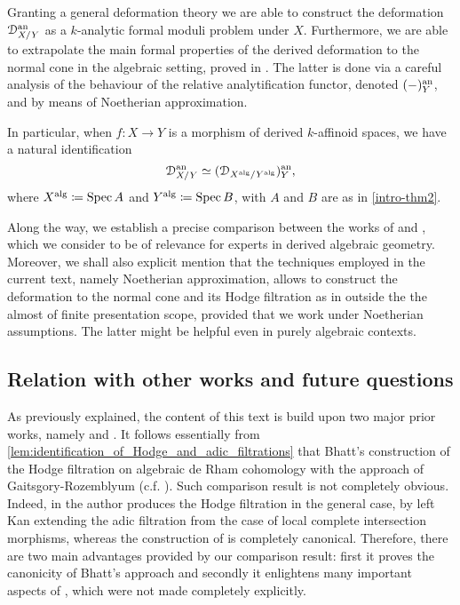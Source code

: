 \documentclass[10pt,a4paper,reqno]{amsart} %
\theoremstyle{plain}
\theoremstyle{definition}
\theoremstyle{remark}
\numberwithin{equation}{section}
\begin{document}
Granting a general deformation theory we are able to construct the deformation $\mathcal D_{X/ Y}^\mathrm{an}$
as a $k$-analytic formal moduli problem
under $X$. Furthermore, we are able to extrapolate the main formal properties of the derived deformation to the normal cone in the algebraic setting, proved in \cite[\S 9]{Gaitsgory_Study_II}.
The latter is done via a careful analysis of the behaviour of the relative analytification functor, denoted $(-)^\mathrm{an}_Y$, and by means of
Noetherian approximation.

In particular, when $f \colon X \to Y$ is a morphism of derived $k$-affinoid spaces, we have a natural identification
    \[
        \mathcal D_{X/ Y}^\mathrm{an} \simeq (\mathcal D_{X^\mathrm{alg}/ Y^\mathrm{alg}} )^\mathrm{an}_Y,  
    \]
where $X^\mathrm{alg} \coloneqq \operatorname{Spec} A$ and $Y^\mathrm{alg} \coloneqq \operatorname{Spec} B$, with $A$ and $B$ are as in \cref{intro-thm2}. 

Along the way, we establish a precise comparison between the works of \cite{Bhatt_Derived_Completions} and \cite[\S 9]{Gaitsgory_Study_II},
which we consider to be of relevance for experts in derived algebraic geometry. Moreover, we shall also explicit mention that the techniques employed in the current
text, namely Noetherian approximation, allows to construct the deformation to the normal cone and its Hodge filtration
as in \cite[\S 9]{Gaitsgory_Study_II} outside the the almost of finite presentation scope, provided that we work under Noetherian assumptions. The latter
might be helpful even in purely algebraic contexts.

\subsection{Relation with other works and future questions} As previously explained, the content of this text is build upon two major prior works,
namely \cite[\S 9]{Gaitsgory_Study_II} and \cite{Bhatt_Derived_Completions}. It follows essentially from \cref{lem:identification_of_Hodge_and_adic_filtrations}
that
Bhatt's construction of the Hodge filtration on algebraic de Rham cohomology with the approach of Gaitsgory-Rozemblyum (c.f. \cite[\S 9]{Gaitsgory_Study_II}).
Such comparison result is not completely obvious. Indeed, in \cite{Bhatt_Derived_Completions} the author produces the Hodge filtration in the general case, by left Kan extending the adic
filtration from the case of local complete intersection morphisms, whereas the construction of \cite[\S 9]{Gaitsgory_Study_II} is completely canonical. Therefore,
there are two main advantages provided by our comparison result: first it proves the canonicity of Bhatt's approach and secondly it enlightens many
important aspects of \cite[\S 9]{Gaitsgory_Study_II}, which were not made completely explicitly. 
\end{document}
